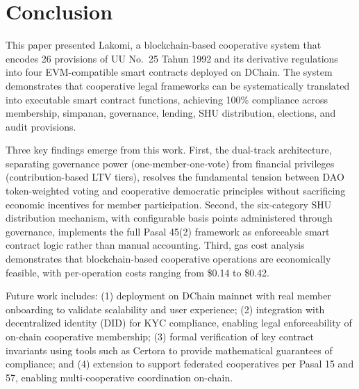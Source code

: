\documentclass[conference]{IEEEtran}
\begin{document}
\section{Conclusion}

This paper presented Lakomi, a blockchain-based cooperative system that encodes 26 provisions of UU No.~25 Tahun 1992 and its derivative regulations into four EVM-compatible smart contracts deployed on DChain. The system demonstrates that cooperative legal frameworks can be systematically translated into executable smart contract functions, achieving 100\% compliance across membership, simpanan, governance, lending, SHU distribution, elections, and audit provisions.

Three key findings emerge from this work. First, the dual-track architecture, separating governance power (one-member-one-vote) from financial privileges (contribution-based LTV tiers), resolves the fundamental tension between DAO token-weighted voting and cooperative democratic principles without sacrificing economic incentives for member participation. Second, the six-category SHU distribution mechanism, with configurable basis points administered through governance, implements the full Pasal 45(2) framework as enforceable smart contract logic rather than manual accounting. Third, gas cost analysis demonstrates that blockchain-based cooperative operations are economically feasible, with per-operation costs ranging from \$0.14 to \$0.42.

Future work includes: (1) deployment on DChain mainnet with real member onboarding to validate scalability and user experience; (2) integration with decentralized identity (DID) for KYC compliance, enabling legal enforceability of on-chain cooperative membership; (3) formal verification of key contract invariants using tools such as Certora to provide mathematical guarantees of compliance; and (4) extension to support federated cooperatives per Pasal 15 and 57, enabling multi-cooperative coordination on-chain.

{}

\end{document}
